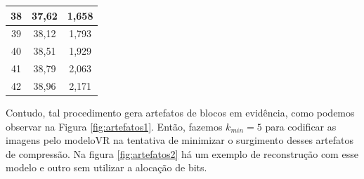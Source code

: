 \begin{table}[h]
{\begin{tabular}{|c|c|c|}
			38                  & 37,62               & 1,658                    \\ \hline
			39                  & 38,12               & 1,793                    \\ \hline
			40                  & 38,51               & 1,929                    \\ \hline
			41                  & 38,79               & 2,063                    \\ \hline
			42                  & 38,96               & 2,171                    \\ \hline
	\end{tabular}}
	\label{table:ba}
\end{table}


Contudo, tal procedimento gera artefatos de blocos em evidência, como podemos observar na Figura \ref{fig:artefatos1}. 
Então, fazemos $k_{min}=5$ para codificar as imagens pelo modeloVR na tentativa de minimizar o surgimento desses artefatos de compressão. Na figura \ref{fig:artefatos2} há um exemplo de reconstrução com esse modelo e outro sem utilizar a alocação de bits.  



